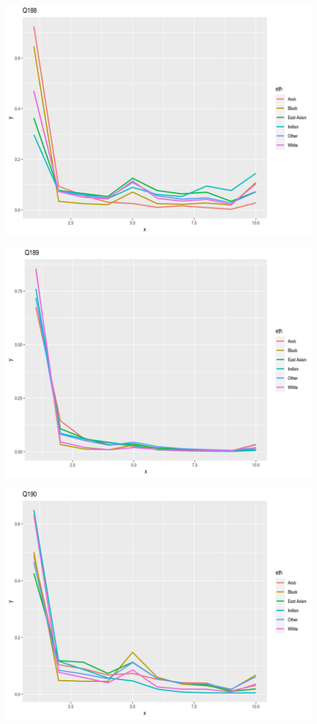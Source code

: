 \documentclass{amsart}
\begin{document}
\includegraphics[scale=0.7]{q188.jpeg}

\includegraphics[scale=0.7]{q189.jpeg}

\includegraphics[scale=0.7]{q190.jpeg}
\end{document}
